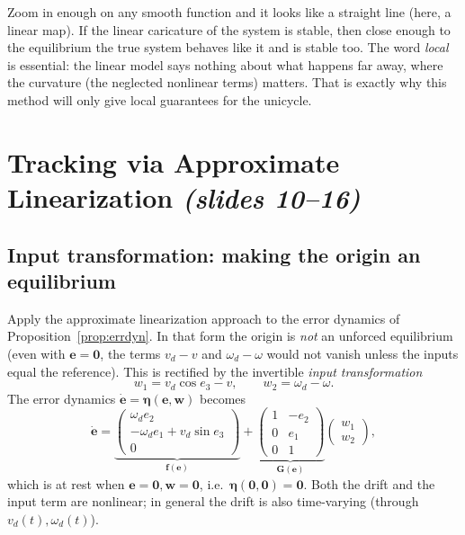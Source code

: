 \documentclass[11pt,a4paper]{article}
\newcommand{\vect}[1]{\bm{#1}}
\newcommand{\vd}{v_d}
\newcommand{\omd}{\omega_d}
\theoremstyle{plain}
\theoremstyle{definition}
\theoremstyle{remark}
\begin{document}
\begin{intuition}
Zoom in enough on any smooth function and it looks like a straight line (here, a linear map). If the linear caricature of the system is stable, then close enough to the equilibrium the true system behaves like it and is stable too. The word \emph{local} is essential: the linear model says nothing about what happens far away, where the curvature (the neglected nonlinear terms) matters. That is exactly why this method will only give local guarantees for the unicycle.
\end{intuition}

\section{Tracking via Approximate Linearization \texorpdfstring{\emph{(slides 10--16)}}{(slides 10--16)}}

\subsection{Input transformation: making the origin an equilibrium}

Apply the approximate linearization approach to the error dynamics of Proposition~\ref{prop:errdyn}. In that form the origin is \emph{not} an unforced equilibrium (even with $\vect e=\vect 0$, the terms $\vd-v$ and $\omd-\omega$ would not vanish unless the inputs equal the reference). This is rectified by the invertible \emph{input transformation}
\begin{equation}\label{eq:inputtransf}
w_1=\vd\cos e_3-v,\qquad w_2=\omd-\omega .
\end{equation}
The error dynamics $\dot{\vect e}=\vect\eta(\vect e,\vect w)$ becomes
\begin{equation}\label{eq:errfG}
\dot{\vect e}=\underbrace{\begin{pmatrix}\omd e_2\\-\omd e_1+\vd\sin e_3\\0\end{pmatrix}}_{\vect f(\vect e)}
+\underbrace{\begin{pmatrix}1&-e_2\\0&e_1\\0&1\end{pmatrix}}_{\vect G(\vect e)}\begin{pmatrix}w_1\\w_2\end{pmatrix},
\end{equation}
which is at rest when $\vect e=\vect 0,\vect w=\vect 0$, i.e.\ $\vect\eta(\vect 0,\vect 0)=\vect 0$. Both the drift and the input term are nonlinear; in general the drift is also time-varying (through $\vd(t),\omd(t)$).
\end{document}
